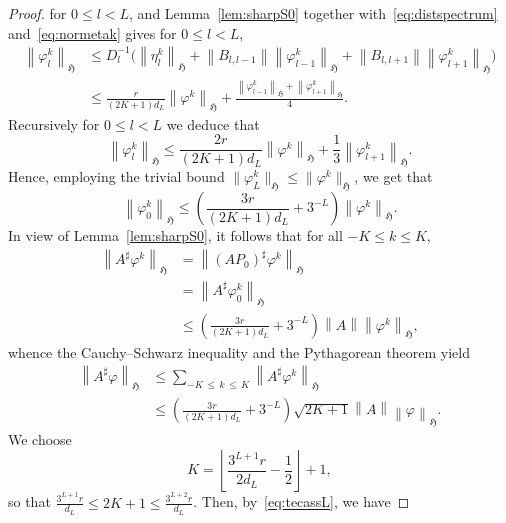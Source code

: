 \documentclass[AHL,Unicode,longabstracts,published]{cedram}
\newcommand{\FH}{\mathfrak H}
\renewcommand{\phi}{\varphi}
\newcommand{\flo}[1]{\left\lfloor#1\right\rfloor}
\newcommand{\norm}[1]{\left\| #1 \right\|}
\begin{document}
\begin{proof}
for $0 \le l <L$, and Lemma~\ref{lem:sharpS0} together with~\eqref{eq:distspectrum} and~\eqref{eq:normetak} gives for $0 \le l < L$,
\begin{equation}\label{eq:normphilk}
\begin{aligned}
\norm{\phi_l^{ k}}_\FH &\le D_l^{-1}\Big(\norm{\eta_l^{ k}}_\FH + \norm{B_{l,l-1}}
\norm{\phi_{l-1}^{ k}}_\FH + \norm{B_{l,l+1}} \norm{\phi_{l+1}^{ k}}_\FH \Big)\\
&\le \frac{r}{(2K+1) d_L} \norm{\phi^{k}}_\FH +
\frac{\norm{\phi_{l-1}^{k}}_\FH +
\norm{\phi_{l+1}^{k}}_\FH}{4}.
\end{aligned}
\end{equation}
Recursively for $0 \le l < L$ we deduce that
\begin{equation}
\norm{\phi^{k}_l}_\FH \le \frac{2r}{(2K+1) d_L}\norm{\phi^{k}}_\FH +
\frac{1}{3}\norm{\phi_{l+1}^k}_\FH.
\end{equation}
Hence, employing the trivial bound $\|\phi_L^k\|_\FH\le \|\phi^k\|_\FH$, we get that
\begin{equation}\label{eq:phi0phik}
\norm{\phi_0^k}_\FH \le \left(\frac{3r}{(2K+1) d_L} + 3^{-L}\right)\norm{\phi^k}_\FH.
\end{equation}
In view of Lemma~\ref{lem:sharpS0}, it follows that for all $- K \le k \le K$,
\begin{equation}
\begin{aligned}
\norm{A^\sharp \phi^{k}}_\FH &= \norm{(AP_0)^\sharp \phi^{k}}_\FH\\&=
\norm{A^\sharp \phi_0^k}_\FH \\&\le \left(\frac{3r}{(2K+1) d_L} + 3^{-L}\right) \norm{A}\norm{\phi^k}_\FH,
\end{aligned}
\end{equation}
whence the Cauchy--Schwarz inequality and the Pythagorean theorem yield
\begin{equation}
\begin{aligned}
\norm{A^\sharp\phi}_\FH &\le \sum_{-K\,\le\,k\,\le\,K} \norm{A^\sharp
\phi^k}_\FH \\
&\le
\left(\frac{3r}{(2K+1) d_L} + 3^{-L}\right)\sqrt{2K+1}\norm{A}
\norm{\phi}_\FH.
\end{aligned}
\end{equation}
We choose
\begin{equation}\label{eq:deltachoice}
K = \flo{\frac{3^{L+1}r}{2d_L} - \frac 1 2} + 1,
\end{equation}
so that $\frac{3^{L+1}r}{d_L}\leq 2K+1\leq \frac{3^{L+2}r}{d_L}$. Then, by~\eqref{eq:tecassL}, we have

\end{proof}
\end{document}

